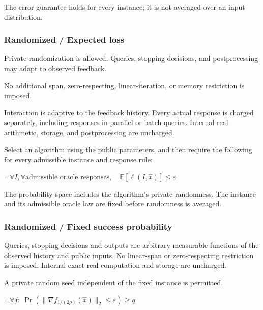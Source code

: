 \documentclass[10pt,a4paper]{article}
\newcommand{\AtlasMath}[1]{\par\begingroup\centering\setbox0=\hbox{$\displaystyle #1$}\ifdim\wd0>1.4\linewidth\typeout{ATLAS WIDE FORMULA: \the\wd0}\fi\ifdim\wd0>\linewidth\resizebox{\linewidth}{!}{\box0}\else\box0\fi\par\endgroup}
\begin{document}
The error guarantee holds for every instance; it is not averaged over an input distribution.



\subsubsection{Randomized / Expected loss}


Private randomization is allowed. Queries, stopping decisions, and postprocessing may adapt to observed feedback.



No additional span, zero-respecting, linear-iteration, or memory restriction is imposed.



Interaction is adaptive to the feedback history. Every actual response is charged separately, including responses in parallel or batch queries. Internal real arithmetic, storage, and postprocessing are uncharged.



Select an algorithm using the public parameters, and then require the following for every admissible instance and response rule:




\AtlasMath{\forall I,\forall\text{admissible oracle responses},\quad\mathbb{E}[\ell(I,\widehat{x})]\le\varepsilon}




The probability space includes the algorithm's private randomness. The instance and its admissible oracle law are fixed before randomness is averaged.



\subsubsection{Randomized / Fixed success probability}


Queries, stopping decisions and outputs are arbitrary measurable functions of the observed history and public inputs. No linear-span or zero-respecting restriction is imposed. Internal exact-real computation and storage are uncharged.



A private random seed independent of the fixed instance is permitted.




\AtlasMath{\forall f:\ \Pr(\|\nabla f_{1/(2\rho)}(\widehat x)\|_2\le\varepsilon)\ge q}
\end{document}

